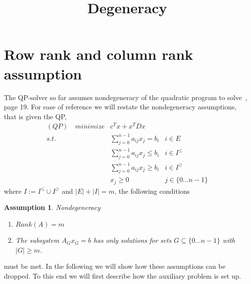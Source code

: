\documentclass[a4paper]{article}
\title{Degeneracy}
\author{}
\newtheorem{assumption}{Assumption}
\begin{document}
\maketitle
\section{Row rank and column rank assumption}
The QP-solver so far assumes nondegeneracy of the quadratic program to
solve~\cite{Sven}, page 19. For ease of reference we will restate the
nondegeneracy assumptions, that is given the QP,
\begin{eqnarray}
\label{def:QP}
(QP)\quad minimize&  c^{T}x + x^{T} D x      	&  \nonumber \\
s.t.	 & \sum_{j=0}^{n-1}a_{ij}x_{j} = b_{i}	& i \in E  \nonumber \\
	 & \sum_{j=0}^{n-1}a_{ij}x_{j} \leq b_{i} & i \in I^{\leq} \\
	 & \sum_{j=0}^{n-1}a_{ij}x_{j} \geq b_{i} & i \in I^{\geq}  \nonumber \\
 	 & x_{j} \geq 0				& j \in \{0 \ldots n-1 \}
	 \nonumber
\end{eqnarray}
where $I:= I^{\leq} \cup I^{\geq}$ and
$\left| E \right| + \left| I \right| = m$,
the following conditions
\begin{assumption} \label{ass:nondegeneracy}
Nondegeneracy

\begin{enumerate}
\item $Rank\left( A \right) = m$
\item The subsystem $A_{G}x_{G} = b$ has only solutions for sets $G \subseteq
\{0 \ldots n-1\}$ with $\left|G \right| \geq m$.
\end{enumerate}
\end{assumption}
must be met. In the following we will show how these
assumptions can be dropped. To this end we will first describe how the auxiliary
problem is set up. 
\end{document}
